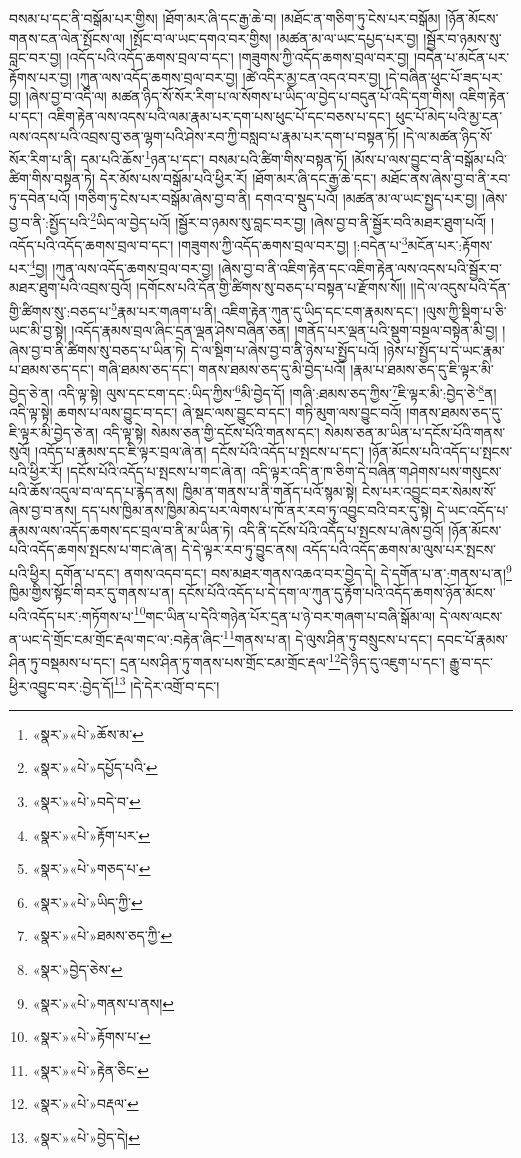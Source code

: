 བསམ་པ་དང་ནི་བསྒོམ་པར་གྱིས། །ཐོག་མར་ཞི་དང་རྒྱ་ཆེ་བ། །མཐོང་ན་གཅིག་ཏུ་ངེས་པར་བསྒོམ། །ཉོན་མོངས་གནས་ངན་ལེན་སྤོངས་ལ། །སྤོང་བ་ལ་ཡང་དགའ་བར་གྱིས། །མཚན་མ་ལ་ཡང་དཔྱད་པར་བྱ། །སྦྱོར་བ་ཉམས་སུ་བླང་བར་བྱ། །འདོད་པའི་འདོད་ཆགས་བྲལ་བ་དང་། །གཟུགས་ཀྱི་འདོད་ཆགས་བྲལ་བར་བྱ། །བདེན་པ་མངོན་པར་རྟོགས་པར་བྱ། །ཀུན་ལས་འདོད་ཆགས་བྲལ་བར་བྱ། །ཚེ་འདིར་མྱ་ངན་འདའ་བར་བྱ། །དེ་བཞིན་ཕུང་པོ་ཟད་པར་བྱ། །ཞེས་བྱ་བ་འདི་ལ། མཚན་ཉིད་སོ་སོར་རིག་པ་ལ་སོགས་པ་ཡིད་ལ་བྱེད་པ་བདུན་པོ་འདི་དག་གིས། འཇིག་རྟེན་པ་དང་། འཇིག་རྟེན་ལས་འདས་པའི་ལམ་རྣམ་པར་དག་པས་ཕུང་པོ་དང་བཅས་པ་དང་། ཕུང་པོ་མེད་པའི་མྱ་ངན་ལས་འདས་པའི་འབྲས་བུ་ཅན་ལྷག་པའི་ཤེས་རབ་ཀྱི་བསླབ་པ་རྣམ་པར་དག་པ་བསྟན་ཏོ། །དེ་ལ་མཚན་ཉིད་སོ་སོར་རིག་པ་ནི། དམ་པའི་ཆོས་\footnote{«སྣར་»«པེ་»ཆོས་མ་}ཉན་པ་དང་། བསམ་པའི་ཚིག་གིས་བསྟན་ཏོ། །མོས་པ་ལས་བྱུང་བ་ནི་བསྒོམ་པའི་ཚིག་གིས་བསྟན་ཏེ། དེར་མོས་པས་བསྒོམ་པའི་ཕྱིར་རོ། །ཐོག་མར་ཞི་དང་རྒྱ་ཆེ་དང་། མཐོང་ནས་ཞེས་བྱ་བ་ནི་རབ་ཏུ་དབེན་པའོ། །གཅིག་ཏུ་ངེས་པར་བསྒོམ་ཞེས་བྱ་བ་ནི། དགའ་བ་སྡུད་པའོ། །མཚན་མ་ལ་ཡང་སྤྱད་པར་བྱ། །ཞེས་བྱ་བ་ནི་:སྤྱོད་པའི་\footnote{«སྣར་»«པེ་»དཔྱོད་པའི་}ཡིད་ལ་བྱེད་པའོ། །སྦྱོར་བ་ཉམས་སུ་བླང་བར་བྱ། །ཞེས་བྱ་བ་ནི་སྦྱོར་བའི་མཐར་ཐུག་པའོ། །འདོད་པའི་འདོད་ཆགས་བྲལ་བ་དང་། །གཟུགས་ཀྱི་འདོད་ཆགས་བྲལ་བར་བྱ། །:བདེན་པ་\footnote{«སྣར་»«པེ་»བདེ་བ་}མངོན་པར་:རྟོགས་པར་\footnote{«སྣར་»«པེ་»རྟོག་པར་}བྱ། །ཀུན་ལས་འདོད་ཆགས་བྲལ་བར་བྱ། །ཞེས་བྱ་བ་ནི་འཇིག་རྟེན་དང་འཇིག་རྟེན་ལས་འདས་པའི་སྦྱོར་བ་མཐར་ཐུག་པའི་འབྲས་བུའོ། །དགོངས་པའི་དོན་གྱི་ཚིགས་སུ་བཅད་པ་བསྟན་པ་རྫོགས་སོ།། །།དེ་ལ་འདུས་པའི་དོན་གྱི་ཚིགས་སུ་:བཅད་པ་\footnote{«སྣར་»«པེ་»གཅད་པ་}རྣམ་པར་གཞག་པ་ནི། འཇིག་རྟེན་ཀུན་དུ་ཡིད་དང་ངག་རྣམས་དང་། །ལུས་ཀྱི་སྡིག་པ་ཅི་ཡང་མི་བྱ་སྟེ། །འདོད་རྣམས་བྲལ་ཞིང་དྲན་ལྡན་ཤེས་བཞིན་ཅན། །གནོད་པར་ལྡན་པའི་སྡུག་བསྔལ་བསྟེན་མི་བྱ། །ཞེས་བྱ་བ་ནི་ཚིགས་སུ་བཅད་པ་ཡིན་ཏེ། དེ་ལ་སྡིག་པ་ཞེས་བྱ་བ་ནི་ཉེས་པ་སྤྱོད་པའོ། །ཉེས་པ་སྤྱོད་པ་དེ་ཡང་རྣམ་པ་ཐམས་ཅད་དང་། གཞི་ཐམས་ཅད་དང་། གནས་ཐམས་ཅད་དུ་མི་བྱེད་པའོ། །རྣམ་པ་ཐམས་ཅད་དུ་ཇི་ལྟར་མི་བྱེད་ཅེ་ན། འདི་ལྟ་སྟེ། ལུས་དང་ངག་དང་:ཡིད་ཀྱིས་\footnote{«སྣར་»«པེ་»ཡིད་ཀྱི་}མི་བྱེད་དོ། །གཞི་:ཐམས་ཅད་ཀྱིས་\footnote{«སྣར་»«པེ་»ཐམས་ཅད་ཀྱི་}ཇི་ལྟར་མི་:བྱེད་ཅེ་\footnote{«སྣར་»བྱེད་ཅེས་}ན། འདི་ལྟ་སྟེ། ཆགས་པ་ལས་བྱུང་བ་དང་། ཞེ་སྡང་ལས་བྱུང་བ་དང་། གཏི་མུག་ལས་བྱུང་བའོ། །གནས་ཐམས་ཅད་དུ་ཇི་ལྟར་མི་བྱེད་ཅེ་ན། འདི་ལྟ་སྟེ། སེམས་ཅན་གྱི་དངོས་པོའི་གནས་དང་། སེམས་ཅན་མ་ཡིན་པ་དངོས་པོའི་གནས་སུའོ། །འདོད་པ་རྣམས་དང་ཇི་ལྟར་བྲལ་ཞེ་ན། དངོས་པོའི་འདོད་པ་སྤངས་པ་དང་། །ཉོན་མོངས་པའི་འདོད་པ་སྤངས་པའི་ཕྱིར་རོ། །དངོས་པོའི་འདོད་པ་སྤངས་པ་གང་ཞེ་ན། འདི་ལྟར་འདི་ན་ཁ་ཅིག་དེ་བཞིན་གཤེགས་པས་གསུངས་པའི་ཆོས་འདུལ་བ་ལ་དད་པ་རྙེད་ནས། ཁྱིམ་ན་གནས་པ་ནི་གནོད་པའོ་སྙམ་སྟེ། ངེས་པར་འབྱུང་བར་སེམས་སོ་ཞེས་བྱ་བ་ནས། དད་པས་ཁྱིམ་ནས་ཁྱིམ་མེད་པར་ལེགས་པ་ཁོ་ནར་རབ་ཏུ་འབྱུང་བའི་བར་དུ་སྟེ། དེ་ཡང་འདོད་པ་རྣམས་ལས་འདོད་ཆགས་དང་བྲལ་བ་ནི་མ་ཡིན་ཏེ། འདི་ནི་དངོས་པོའི་འདོད་པ་སྤངས་པ་ཞེས་བྱའོ། །ཉོན་མོངས་པའི་འདོད་ཆགས་སྤངས་པ་གང་ཞེ་ན། དེ་དེ་ལྟར་རབ་ཏུ་བྱུང་ནས། འདོད་པའི་འདོད་ཆགས་མ་ལུས་པར་སྤངས་པའི་ཕྱིར། དགོན་པ་དང་། ནགས་འདབ་དང་། བས་མཐར་གནས་འཆའ་བར་བྱེད་དེ། དེ་དགོན་པ་ན་:གནས་པ་ན།\footnote{«སྣར་»«པེ་»གནས་པ་ནས།} ཁྱིམ་གྱིས་སྟོང་གི་བར་དུ་གནས་པ་ན། དངོས་པོའི་འདོད་པ་དེ་དག་ལ་ཀུན་དུ་རྟོག་པའི་འདོད་ཆགས་ཉོན་མོངས་པའི་འདོད་པར་:གཏོགས་པ་\footnote{«སྣར་»«པེ་»རྟོགས་པ་}གང་ཡིན་པ་དེའི་གཉེན་པོར་དྲན་པ་ཉེ་བར་གཞག་པ་བཞི་སྒོམ་ལ། དེ་ལས་ལངས་ན་ཡང་དེ་གྲོང་ངམ་གྲོང་རྡལ་གང་ལ་:བརྟེན་ཞིང་\footnote{«སྣར་»«པེ་»རྟེན་ཅིང་}གནས་པ་ན། དེ་ལུས་ཤིན་ཏུ་བསྲུངས་པ་དང་། དབང་པོ་རྣམས་ཤིན་ཏུ་བསྡམས་པ་དང་། དྲན་པས་ཤིན་ཏུ་གནས་པས་གྲོང་ངམ་གྲོང་རྡལ་\footnote{«སྣར་»«པེ་»བརྡལ་}དེ་ཉིད་དུ་འཇུག་པ་དང་། རྒྱུ་བ་དང་ཕྱིར་འབྱུང་བར་:བྱེད་དོ།\footnote{«སྣར་»«པེ་»བྱེད་དེ།} །དེ་དེར་འགྲོ་བ་དང་། 